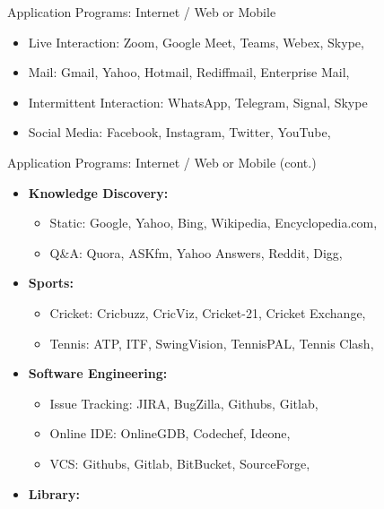 \documentclass[aspectratio=169, xcolor=dvipsnames]{beamer}
\begin{document}
\begin{frame}{Application Programs: Internet / Web or Mobile}
\begin{itemize}[<+->]
        \begin{itemize}
            \item[$\triangleright$] Live Interaction: Zoom, Google Meet, Teams, Webex, Skype,
            \item[$\triangleright$] Mail: Gmail, Yahoo, Hotmail, Rediffmail, Enterprise Mail,
            \item[$\triangleright$] Intermittent Interaction: WhatsApp, Telegram, Signal, Skype
            \item[$\triangleright$] Social Media: Facebook, Instagram, Twitter, YouTube,
        \end{itemize}
    \end{itemize}
\end{frame}

\begin{frame}{Application Programs: Internet / Web or Mobile (cont.)}
    \begin{itemize}[<+->]
        \item \textbf{Knowledge Discovery:}
        \begin{itemize}
            \item[$\triangleright$] Static: Google, Yahoo, Bing, Wikipedia, Encyclopedia.com,
            \item[$\triangleright$] Q\&A: Quora, ASKfm, Yahoo Answers, Reddit, Digg,
        \end{itemize}
        \item \textbf{Sports:}
        \begin{itemize}
            \item[$\triangleright$] Cricket: Cricbuzz, CricViz, Cricket-21, Cricket Exchange,
            \item[$\triangleright$] Tennis: ATP, ITF, SwingVision, TennisPAL, Tennis Clash,
        \end{itemize}
        \item \textbf{Software Engineering:}
        \begin{itemize}
            \item[$\triangleright$] Issue Tracking: JIRA, BugZilla, Githubs, Gitlab,
            \item[$\triangleright$] Online IDE: OnlineGDB, Codechef, Ideone,
            \item[$\triangleright$] VCS: Githubs, Gitlab, BitBucket, SourceForge,
        \end{itemize}
        \item \textbf{Library:}
        \begin{itemize}

\end{itemize}
\end{itemize}
\end{frame}
\end{document}
